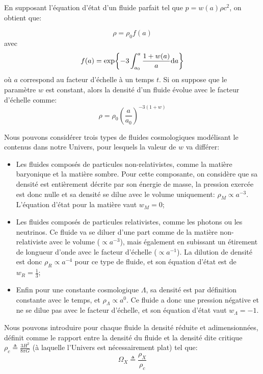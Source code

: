 \documentclass[../main/main.tex]{subfiles}
\begin{document}
En supposant l'équation d'état d'un fluide parfait tel que $p=w(a)\rho
c^{2}$, on obtient que:

\begin{equation}
  \label{eq:30}
  \rho=\rho_{0}f(a)
\end{equation}
avec
\begin{equation}
  \label{eq:31}
  f(a)=\exp{-3\int_{a_{0}}^{a}\frac{1+w(a)}{a}\mathrm{d}a}
\end{equation}
où $a$ correspond au facteur d'échelle à un temps $t$. Si on suppose que
le paramètre $w$ est constant, alors la densité d'un fluide évolue avec
le facteur d'échelle comme:
\begin{equation}
  \label{eq:rhoevol}
  \rho=\rho_{0}\left(\frac{a}{a_{0}}\right)^{-3(1+w)}
\end{equation}

Nous pouvons considérer trois types de fluides cosmologiques modélisant
le contenus dans notre
Univers, pour lesquels la valeur de $w$ va différer:
\begin{itemize}
\item Les fluides composés de particules non-relativistes, comme la
  matière baryonique et la matière sombre. Pour cette composante, on
  considère que sa densité est entièrement décrite par son énergie de
  masse, la pression exercée est donc
  nulle et sa densité se dilue avec le volume uniquement: $\rho_{M}\propto a^{-3}$. L'équation d'état pour la matière vaut $w_{M}=0$;
\item Les fluides composés de particules relativistes, comme les
  photons ou les neutrinos. Ce fluide va se diluer d'une part comme
  de la matière non-relativiste avec le volume ($\propto a^{-3}$), mais également en
  subissant un étirement de longueur d'onde avec le facteur d'échelle
  ($\propto a^{-1}$). La dilution de densité est donc
  $\rho_{R}\propto a^{-4}$ pour ce type de fluide, et son équation d'état est de
  $w_{R}=\frac{1}{3}$;
\item Enfin pour une constante cosmologique $\Lambda$, sa densité est
  par définition constante avec le temps, et $\rho_{\Lambda}\propto
  a^{0}$. Ce fluide a donc une pression négative et ne se dilue pas
  avec le facteur d'échelle, et son équation d'état vaut $w_{\Lambda}=-1$.
\end{itemize}

Nous pouvons introduire pour chaque fluide la densité réduite et
adimensionnées, définit comme le
rapport entre la densité du fluide et la densité dite critique
$\rho_{c}\triangleq\frac{3H^{2}}{8\pi G}$ (à
laquelle l'Univers est nécessairement plat) tel que:
\begin{equation}
  \label{eq:33}
  \Omega_{X}\triangleq\frac{\rho_{X}}{\rho_{c}}
\end{equation}
\end{document}
